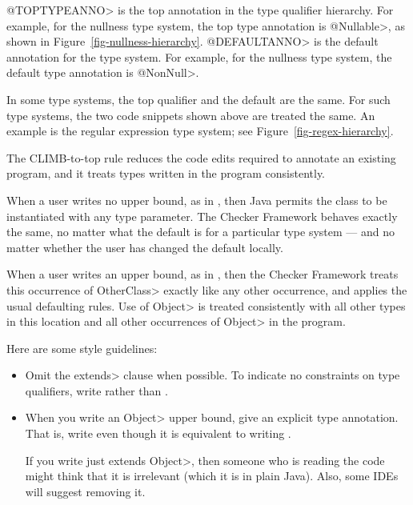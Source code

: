 \noindent
\<@TOPTYPEANNO> is the top annotation in the type qualifier hierarchy.  For
example, for the nullness type system, the top type annotation is
\<@Nullable>, as shown in Figure~\ref{fig-nullness-hierarchy}.
\<@DEFAULTANNO> is the default annotation for the type system.  For
example, for the nullness type system, the default type annotation is
\<@NonNull>.

In some type systems, the top qualifier and the default are the same.  For
such type systems, the two code snippets shown above are treated the same.
An example is the regular expression type system; see
Figure~\ref{fig-regex-hierarchy}.

The CLIMB-to-top rule reduces the code edits required to annotate an
existing program, and it treats types written in the program consistently.

When a user writes no upper bound, as in
,
then Java permits the class to be instantiated with any type parameter.
The Checker Framework behaves exactly the same, no matter what the default
is for a particular type system --- and no matter whether the user has
changed the default locally.

When a user writes an upper bound, as in
,
then the Checker Framework treats this occurrence of \<OtherClass> exactly
like any other occurrence, and applies the usual defaulting rules.  Use of
\<Object> is treated consistently with all other types in this location and
all other occurrences of \<Object> in the program.

Here are some style guidelines:
\begin{itemize}
\item
  Omit the \<extends> clause when possible.  To indicate no constraints on
  type qualifiers, write  rather than .
\item
  When you write an \<Object> upper bound, give an explicit type annotation.
  That is, write  even though it is equivalent to writing
  .

  If you write just \<extends Object>, then someone who is reading the code
  might think that it is irrelevant (which it is in plain Java).  Also,
  some IDEs will suggest removing it.
\end{itemize}


